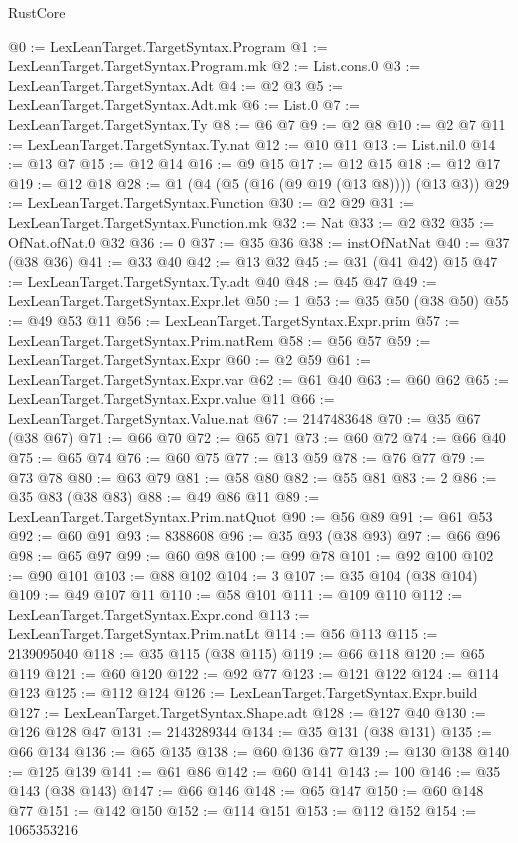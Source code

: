 \begin{lexlean}{RustCore}
\begin{coremodule}
@0 := LexLeanTarget.TargetSyntax.Program
@1 := LexLeanTarget.TargetSyntax.Program.mk
@2 := List.cons.{0}
@3 := LexLeanTarget.TargetSyntax.Adt
@4 := @2 @3
@5 := LexLeanTarget.TargetSyntax.Adt.mk
@6 := List.{0}
@7 := LexLeanTarget.TargetSyntax.Ty
@8 := @6 @7
@9 := @2 @8
@10 := @2 @7
@11 := LexLeanTarget.TargetSyntax.Ty.nat
@12 := @10 @11
@13 := List.nil.{0}
@14 := @13 @7
@15 := @12 @14
@16 := @9 @15
@17 := @12 @15
@18 := @12 @17
@19 := @12 @18
@28 := @1 (@4 (@5 (@16 (@9 @19 (@13 @8)))) (@13 @3))
@29 := LexLeanTarget.TargetSyntax.Function
@30 := @2 @29
@31 := LexLeanTarget.TargetSyntax.Function.mk
@32 := Nat
@33 := @2 @32
@35 := OfNat.ofNat.{0} @32
@36 := 0
@37 := @35 @36
@38 := instOfNatNat
@40 := @37 (@38 @36)
@41 := @33 @40
@42 := @13 @32
@45 := @31 (@41 @42) @15
@47 := LexLeanTarget.TargetSyntax.Ty.adt @40
@48 := @45 @47
@49 := LexLeanTarget.TargetSyntax.Expr.let
@50 := 1
@53 := @35 @50 (@38 @50)
@55 := @49 @53 @11
@56 := LexLeanTarget.TargetSyntax.Expr.prim
@57 := LexLeanTarget.TargetSyntax.Prim.natRem
@58 := @56 @57
@59 := LexLeanTarget.TargetSyntax.Expr
@60 := @2 @59
@61 := LexLeanTarget.TargetSyntax.Expr.var
@62 := @61 @40
@63 := @60 @62
@65 := LexLeanTarget.TargetSyntax.Expr.value @11
@66 := LexLeanTarget.TargetSyntax.Value.nat
@67 := 2147483648
@70 := @35 @67 (@38 @67)
@71 := @66 @70
@72 := @65 @71
@73 := @60 @72
@74 := @66 @40
@75 := @65 @74
@76 := @60 @75
@77 := @13 @59
@78 := @76 @77
@79 := @73 @78
@80 := @63 @79
@81 := @58 @80
@82 := @55 @81
@83 := 2
@86 := @35 @83 (@38 @83)
@88 := @49 @86 @11
@89 := LexLeanTarget.TargetSyntax.Prim.natQuot
@90 := @56 @89
@91 := @61 @53
@92 := @60 @91
@93 := 8388608
@96 := @35 @93 (@38 @93)
@97 := @66 @96
@98 := @65 @97
@99 := @60 @98
@100 := @99 @78
@101 := @92 @100
@102 := @90 @101
@103 := @88 @102
@104 := 3
@107 := @35 @104 (@38 @104)
@109 := @49 @107 @11
@110 := @58 @101
@111 := @109 @110
@112 := LexLeanTarget.TargetSyntax.Expr.cond
@113 := LexLeanTarget.TargetSyntax.Prim.natLt
@114 := @56 @113
@115 := 2139095040
@118 := @35 @115 (@38 @115)
@119 := @66 @118
@120 := @65 @119
@121 := @60 @120
@122 := @92 @77
@123 := @121 @122
@124 := @114 @123
@125 := @112 @124
@126 := LexLeanTarget.TargetSyntax.Expr.build
@127 := LexLeanTarget.TargetSyntax.Shape.adt
@128 := @127 @40
@130 := @126 @128 @47
@131 := 2143289344
@134 := @35 @131 (@38 @131)
@135 := @66 @134
@136 := @65 @135
@138 := @60 @136 @77
@139 := @130 @138
@140 := @125 @139
@141 := @61 @86
@142 := @60 @141
@143 := 100
@146 := @35 @143 (@38 @143)
@147 := @66 @146
@148 := @65 @147
@150 := @60 @148 @77
@151 := @142 @150
@152 := @114 @151
@153 := @112 @152
@154 := 1065353216

\end{coremodule}
\end{lexlean}
